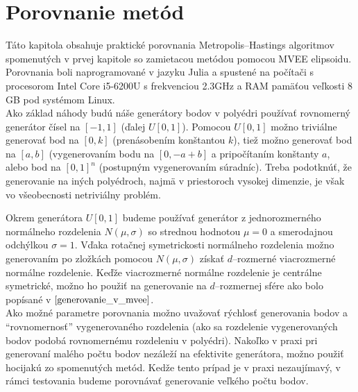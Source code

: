 \chapter{Porovnanie metód}

Táto kapitola obsahuje praktické porovnania Metropolis--Hastings algoritmov spomenutých v prvej kapitole so zamietacou metódou pomocou MVEE elipsoidu. Porovnania boli naprogramované v jazyku Julia a spustené na počítači s procesorom Intel Core i5-6200U s frekvenciou 2.3GHz a RAM pamäťou veľkosti 8 GB pod systémom Linux.\\

Ako základ náhody budú náše generátory bodov v polyédri používať rovnomerný generátor čísel na $[-1,1]$ (ďalej $U[0,1]$). Pomocou $U[0,1]$ možno triviálne generovať bod na $[0,k]$ (prenásobením konštantou $k$), tiež možno generovať bod na $[a,b]$ (vygenerovaním bodu na $[0, -a+b]$ a pripočítaním konštanty $a$, alebo bod na $[0,1]^n$ (postupným vygenerovaním súradníc). Treba podotknúť, že generovanie na iných polyédroch, najmä v priestoroch vysokej dimenzie, je však vo všeobecnosti netriviálny problém.

Okrem generátora $U[0,1]$ budeme používať generátor z jednorozmerného normálneho rozdelenia $N(\mu, \sigma)$ so strednou hodnotou $\mu=0$ a smerodajnou odchýlkou $\sigma=1$. Vďaka rotačnej symetrickosti normálneho rozdelenia možno generovaním po zložkách pomocou $N(\mu, \sigma)$ získať $d$--rozmerné viacrozmerné normálne rozdelenie.
Keďže viacrozmerné normálne rozdelenie je centrálne symetrické, možno ho použiť na generovanie na $d$--rozmernej sfére ako bolo popísané v $\ref{generovanie_v_mvee}$.\\

Ako možné parametre porovnania možno uvažovať rýchlosť generovania bodov a ``rovnomernosť'' vygenerovaného rozdelenia (ako sa rozdelenie vygenerovaných bodov podobá rovnomernému rozdeleniu v polyédri).
Nakoľko v praxi pri generovaní malého počtu bodov nezáleží na efektivite generátora, možno použiť hocijakú zo spomenutých metód. Kedže tento prípad je v praxi nezaujímavý, v rámci testovania budeme porovnávať generovanie veľkého počtu bodov.

